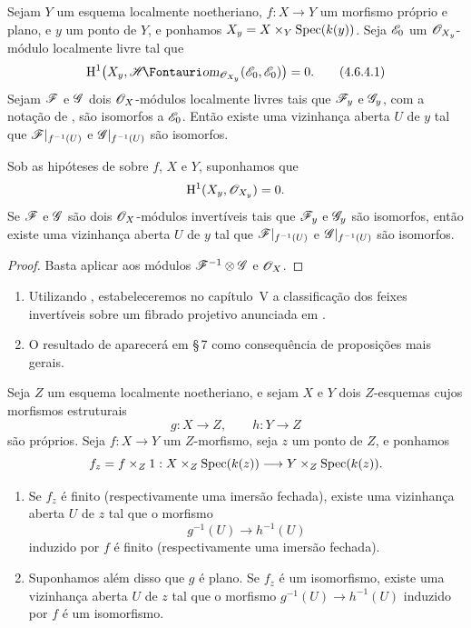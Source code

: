 \begin{corollary}[4.6.4]
\label{III.4.6.4}
Sejam $Y$ um esquema localmente noetheriano, $f:X\to Y$ um
morfismo próprio e plano, e $y$ um ponto de $Y$, e ponhamos
$X_y=X\times_Y\operatorname{Spec}(k(y))$. Seja $\mathscr{E}_0$ um
$\mathscr{O}_{X_y}$-módulo localmente livre tal que
\[
\label{III.4.6.4.1}
  \HH^1\bigl(
    X_y,\shHom_{\sh{O}_{X_y}}(\sh{E}_0,\sh{E}_0)
  \bigr)=0.
  \tag{4.6.4.1}
\]
Sejam $\mathscr{F}$ e $\mathscr{G}$ dois $\mathscr{O}_X$-módulos localmente livres
tais que $\mathscr{F}_y$ e $\mathscr{G}_y$, com a notação de
, são isomorfos a $\mathscr{E}_0$. Então existe uma
vizinhança aberta $U$ de $y$ tal que
$\mathscr{F}|_{f^{-1}(U)}$ e $\mathscr{G}|_{f^{-1}(U)}$ são isomorfos.
\end{corollary}

\begin{corollary}[4.6.5]
\label{III.4.6.5}
Sob as hipóteses de  sobre $f$, $X$ e $Y$,
suponhamos que
\[
  \mathrm{H}^1(X_y,\mathscr{O}_{X_y})=0.
\]
Se $\mathscr{F}$ e $\mathscr{G}$ são dois $\mathscr{O}_X$-módulos invertíveis tais
que $\mathscr{F}_y$ e $\mathscr{G}_y$ são isomorfos, então existe uma vizinhança
aberta $U$ de $y$ tal que $\mathscr{F}|_{f^{-1}(U)}$ e
$\mathscr{G}|_{f^{-1}(U)}$ são isomorfos.
\end{corollary}

\begin{proof}
Basta aplicar  aos módulos
$\mathscr{F}^{-1}\otimes\mathscr{G}$ e $\mathscr{O}_X$.
\end{proof}

\begin{remarks}[4.6.6]
\label{III.4.6.6}
\begin{enumerate}
\item[(i)] Utilizando , estabeleceremos no capítulo~V
  a classificação dos feixes invertíveis sobre um fibrado projetivo
  anunciada em .
\item[(ii)] O resultado de  aparecerá em \S\,7 como
  consequência de proposições mais gerais.
\end{enumerate}
\end{remarks}

\begin{proposition}[4.6.7]
\label{III.4.6.7}
Seja $Z$ um esquema localmente noetheriano, e sejam $X$ e $Y$
dois $Z$-esquemas cujos morfismos estruturais
\[
  g:X\longrightarrow Z,\qquad h:Y\longrightarrow Z
\]
são próprios. Seja $f:X\to Y$ um $Z$-morfismo, seja $z$ um ponto
de $Z$, e ponhamos
\[
  f_z=f\times_Z1:
  X\times_Z\operatorname{Spec}(k(z))
  \longrightarrow
  Y\times_Z\operatorname{Spec}(k(z)).
\]
\begin{enumerate}
\item[(i)] Se $f_z$ é finito (respectivamente uma imersão fechada),
  existe uma vizinhança aberta $U$ de $z$ tal que o morfismo
  \[
    g^{-1}(U)\longrightarrow h^{-1}(U)
  \]
  induzido por $f$ é finito (respectivamente uma imersão fechada).
\item[(ii)] Suponhamos além disso que $g$ é plano. Se $f_z$ é um
  isomorfismo, existe uma vizinhança aberta $U$ de $z$ tal que
  o morfismo $g^{-1}(U)\to h^{-1}(U)$ induzido por $f$ é um
  isomorfismo.
\end{enumerate}
\end{proposition}

